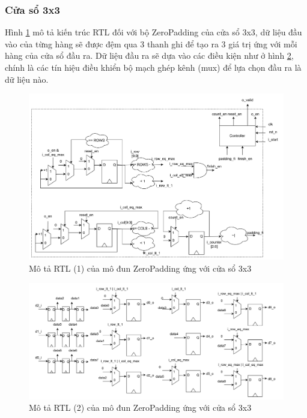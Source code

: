 \subsubsection{Cửa sổ 3x3}
Hình \ref{fig:zero3x3Architecture1} mô tả kiến trúc RTL đối với bộ ZeroPadding của cửa sổ 3x3, dữ liệu đầu vào của từng hàng sẽ được đệm qua 3 thanh ghi để tạo ra 3 giá trị ứng với mỗi hàng của cửa sổ đầu ra. Dữ liệu đầu ra sẽ dựa vào các điều kiện như ở hình \ref{fig:zero3x3Architecture2}, chính là các tín hiệu điều khiển bộ mạch ghép kênh (mux) để lựa chọn đầu ra là dữ liệu nào.
\begin{figure}[!ht]
    \centering
    \includegraphics[width=\linewidth]{figures/zero3x3Architecture1.png}
    \caption{Mô tả RTL (1) của mô đun ZeroPadding ứng với cửa sổ 3x3}
    \label{fig:zero3x3Architecture1}
\end{figure}

\begin{figure}[!ht]
    \centering
    \includegraphics[width=\linewidth]{figures/zero3x3Architecture2.png}
    \caption{Mô tả RTL (2) của mô đun ZeroPadding ứng với cửa sổ 3x3}
    \label{fig:zero3x3Architecture2}
\end{figure}


